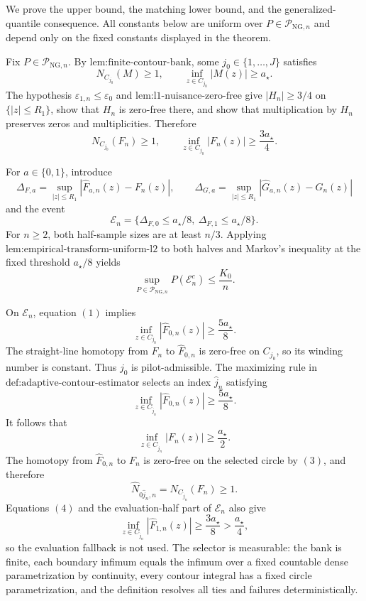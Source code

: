We prove the upper bound, the matching lower bound, and the generalized-quantile consequence.  All constants below are uniform over \(P\in\mathcal P_{\mathrm{NG},n}\) and depend only on the fixed constants displayed in the theorem.

Fix \(P\in\mathcal P_{\mathrm{NG},n}\).  By \(\text{lem:finite-contour-bank}\), some \(j_0\in\{1,\ldots,J\}\) satisfies
\[
 N_{C_{j_0}}(M)\ge1,
 \qquad
 \inf_{z\in C_{j_0}}|M(z)|\ge a_\star.
\]
The hypothesis \(\varepsilon_{1,n}\le\varepsilon_0\) and \(\text{lem:l1-nuisance-zero-free}\) give \(|H_n|\ge3/4\) on \(\{|z|\le R_1\}\), show that \(H_n\) is zero-free there, and show that multiplication by \(H_n\) preserves zeros and multiplicities.  Therefore
\[
 N_{C_{j_0}}(F_n)\ge1,
 \qquad
 \inf_{z\in C_{j_0}}|F_n(z)|\ge\frac{3a_\star}{4}. \tag{1}
\]

For \(a\in\{0,1\}\), introduce
\[
 \Delta_{F,a}=\sup_{|z|\le R_1}|\widehat F_{a,n}(z)-F_n(z)|,
 \qquad
 \Delta_{G,a}=\sup_{|z|\le R_1}|\widehat G_{a,n}(z)-G_n(z)|
\]
and the event
\[
 \mathcal E_n
 =\{\Delta_{F,0}\le a_\star/8,\ \Delta_{F,1}\le a_\star/8\}.
\]
For \(n\ge2\), both half-sample sizes are at least \(n/3\).  Applying \(\text{lem:empirical-transform-uniform-l2}\) to both halves and Markov's inequality at the fixed threshold \(a_\star/8\) yields
\[
 \sup_{P\in\mathcal P_{\mathrm{NG},n}}P(\mathcal E_n^c)
 \le\frac{K_0}{n}. \tag{2}
\]

On \(\mathcal E_n\), equation \((1)\) implies
\[
 \inf_{z\in C_{j_0}}|\widehat F_{0,n}(z)|
 \ge\frac{5a_\star}{8}.
\]
The straight-line homotopy from \(F_n\) to \(\widehat F_{0,n}\) is zero-free on \(C_{j_0}\), so its winding number is constant.  Thus \(j_0\) is pilot-admissible.  The maximizing rule in \(\text{def:adaptive-contour-estimator}\) selects an index \(\widehat j_n\) satisfying
\[
 \inf_{z\in C_{\widehat j_n}}|\widehat F_{0,n}(z)|
 \ge\frac{5a_\star}{8}. \tag{3}
\]
It follows that
\[
 \inf_{z\in C_{\widehat j_n}}|F_n(z)|
 \ge\frac{a_\star}{2}. \tag{4}
\]
The homotopy from \(\widehat F_{0,n}\) to \(F_n\) is zero-free on the selected circle by \((3)\), and therefore
\[
 \widehat N_{0\widehat j_n,n}
 =N_{C_{\widehat j_n}}(F_n)\ge1. \tag{5}
\]
Equations \((4)\) and the evaluation-half part of \(\mathcal E_n\) also give
\[
 \inf_{z\in C_{\widehat j_n}}|\widehat F_{1,n}(z)|
 \ge\frac{3a_\star}{8}>\frac{a_\star}{4}, \tag{6}
\]
so the evaluation fallback is not used.  The selector is measurable: the bank is finite, each boundary infimum equals the infimum over a fixed countable dense parametrization by continuity, every contour integral has a fixed circle parametrization, and the definition resolves all ties and failures deterministically.

